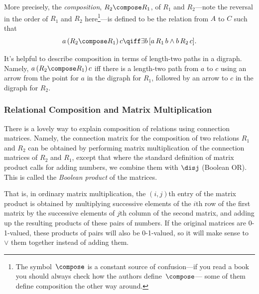 More precisely, the \emph{composition}, $R_2 \compose R_1$, of $R_1$ and
$R_2$---note the reversal in the order of $R_1$ and $R_2$
here\footnote{The symbol~$\compose$ is a constant source of confusion---if
you read a book you should always check how the authors define~$\compose$---
some of them define composition the other way around.}---is defined to be
the relation from $A$ to $C$ such that
\begin{displaymath}
a\, (R_2 \compose R_1)\, c  \qiff \exists b\, [a\, R_1\, b \land b\, R_2\, c].
\end{displaymath}

It's helpful to describe composition in terms of length-two paths in a
digraph.  Namely, $a\, (R_2 \compose R_1)\, c$ iff there is a length-two path
from $a$ to $c$ using an arrow from the point for $a$ in the digraph for
$R_1$, followed by an arrow to $c$ in the digraph for $R_2$.
\fi


\subsubsection{Relational Composition and Matrix Multiplication}

There is a lovely way to explain composition of relations using connection
matrices.  Namely, the connection matrix for the composition of two
relations $R_1$ and $R_2$ can be obtained by performing matrix
multiplication of the connection matrices of $R_2$ and $R_1$, except that
where the standard definition of matrix product calls for adding numbers,
we combine them with $\disj$ (Boolean OR).  This is called the \emph{Boolean
product} of the matrices.

That is, in ordinary matrix multiplication, the $(i,j)$th entry of the
matrix product is obtained by multiplying successive elements of the $i$th
row of the first matrix by the successive elements of $j$th column of the
second matrix, and adding up the resulting products of these pairs of
numbers.  If the original matrices are 0-1-valued, these products of
pairs will also be 0-1-valued, so it will make sense to $\lor$ them
together instead of adding them.

